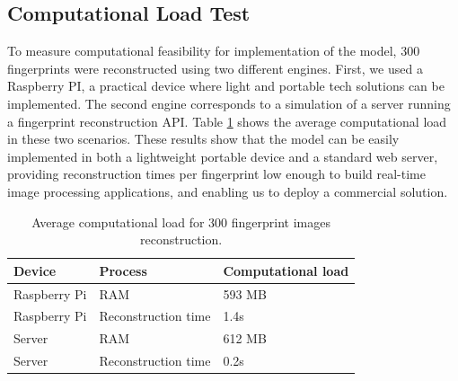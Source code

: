 \documentclass[a4paper,fleqn]{cas-dc}
\begin{document}
\subsection{Computational Load Test}
\label{sec:CLT}
To measure computational feasibility for implementation of the model, 300 fingerprints were reconstructed using two different engines. First, we used a Raspberry PI, a practical device where light and portable tech solutions can be implemented. The second engine corresponds to a simulation of a server running a fingerprint reconstruction API. Table \ref{table:computational_load} shows the average computational load in these two scenarios. These results show that the model can be easily implemented in both a lightweight portable device and a standard web server, providing reconstruction times per fingerprint low enough to build real-time image processing applications, and enabling us to deploy a commercial solution.
\begin{table}[h!]\label{table:computational_load}
\caption{Average computational load for 300 fingerprint images reconstruction.}
\centering
 \begin{tabular}{|lll|} 
 \hline
 Device & Process & Computational load\\ 
 \hline
 Raspberry Pi & RAM & 593 MB \\ 
 Raspberry Pi & Reconstruction time & 1.4s \\
 Server & RAM & 612 MB \\ 
 Server & Reconstruction time & 0.2s \\ 
 \hline
 \end{tabular}
\end{table}

\end{document}
